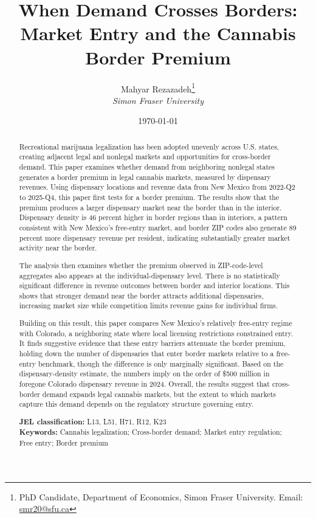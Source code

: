 \documentclass[english,12pt]{article}
\begin{document}
\title{When Demand Crosses Borders: Market Entry and the Cannabis Border Premium}
\author{Mahyar Rezazadeh\thanks{PhD Candidate, Department of Economics, Simon Fraser University. Email: \href{mailto:smr20@sfu.ca}{smr20@sfu.ca}}\\ {\small \emph{Simon Fraser University}}}
\date{\today}
\maketitle
\thispagestyle{empty}
\begin{abstract}
\noindent Recreational marijuana legalization has been adopted unevenly across U.S. states, creating adjacent legal and nonlegal markets and opportunities for cross-border demand. This paper examines whether demand from neighboring nonlegal states generates a border premium in legal cannabis markets, measured by dispensary revenues. Using dispensary locations and revenue data from New Mexico from 2022-Q2 to 2025-Q4, this paper first tests for a border premium. The results show that the premium produces a larger dispensary market near the border than in the interior. Dispensary density is 46 percent higher in border regions than in interiors, a pattern consistent with New Mexico's free-entry market, and border ZIP codes also generate 89 percent more dispensary revenue per resident, indicating substantially greater market activity near the border.

The analysis then examines whether the premium observed in ZIP-code-level aggregates also appears at the individual-dispensary level. There is no statistically significant difference in revenue outcomes between border and interior locations. This shows that stronger demand near the border attracts additional dispensaries, increasing market size while competition limits revenue gains for individual firms.

Building on this result, this paper compares New Mexico's relatively free-entry regime with Colorado, a neighboring state where local licensing restrictions constrained entry. It finds suggestive evidence that these entry barriers attenuate the border premium, holding down the number of dispensaries that enter border markets relative to a free-entry benchmark, though the difference is only marginally significant. Based on the dispensary-density estimate, the numbers imply on the order of \$500 million in foregone Colorado dispensary revenue in 2024. Overall, the results suggest that cross-border demand expands legal cannabis markets, but the extent to which markets capture this demand depends on the regulatory structure governing entry.

\medskip
\noindent \textbf{JEL classification:} L13, L51, H71, R12, K23 \\
\noindent \textbf{Keywords:} Cannabis legalization; Cross-border demand; Market entry regulation; Free entry; Border premium
\end{abstract}
\doublespacing
\newpage
\end{document}
